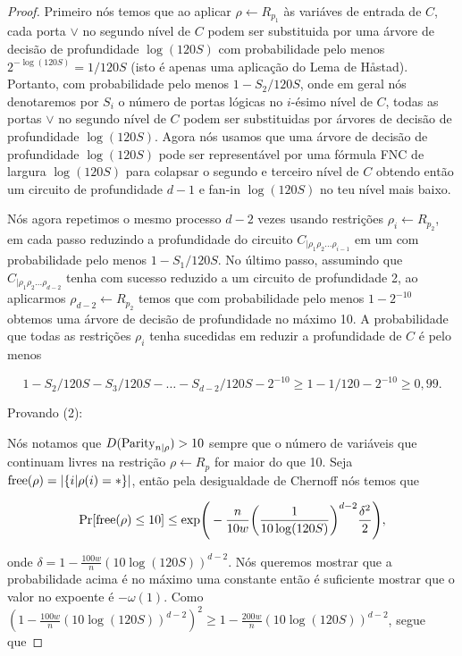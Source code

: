 \begin{proof}
	Primeiro nós temos que ao aplicar $\rho \leftarrow R_{p_{1}}$ às variáves de entrada de $C$, cada porta $\lor$ no segundo nível de $C$ podem ser substituida por uma árvore de decisão de profundidade $\log(120S)$ com probabilidade pelo menos $2^{-\log(120S)} = 1/120S$ (isto é apenas uma aplicação do Lema de Håstad). Portanto, com probabilidade pelo menos $1 - S_{2}/120S$, onde em geral nós denotaremos por $S_{i}$ o número de portas lógicas no $i$-ésimo nível de $C$, todas as portas $\lor$ no segundo nível de $C$ podem ser substituidas por árvores de decisão de profundidade $\log(120S)$. Agora nós usamos que uma árvore de decisão de profundidade $\log(120S)$ pode ser representável por uma fórmula FNC de largura $\log(120S)$ para colapsar o segundo e terceiro nível de $C$ obtendo então um circuito de profundidade $d - 1$ e fan-in $\log(120S)$ no teu nível mais baixo.
	
	Nós agora repetimos o mesmo processo $d - 2$ vezes usando restrições $\rho_{i} \leftarrow R_{p_{2}}$, em cada passo reduzindo a profundidade do circuito $C_{\lvert \rho_{1}\rho_{2}\dots\rho_{i - 1}}$ em um com probabilidade pelo menos $1 - S_{1}/120S$. No último passo, assumindo que $C_{\lvert \rho_{1}\rho_{2}\dots\rho_{d - 2}}$ tenha com sucesso reduzido a um circuito de profundidade 2, ao aplicarmos $\rho_{d - 2} \leftarrow R_{p_{2}}$ temos que com probabilidade pelo menos $1 - 2^{-10}$ obtemos uma árvore de decisão de profundidade no máximo 10. A probabilidade que todas as restrições $\rho_{i}$ tenha sucedidas em reduzir a profundidade de $C$ é pelo menos
	
	\begin{equation*}
		1 - S_{2}/120S - S_{3}/120S - \dots - S_{d - 2}/120S - 2^{-10} \geq 1 - 1/120 - 2^{-10} \geq 0,99.
	\end{equation*}
	
	Provando (2):
	
	Nós notamos que $D(\text{Parity}_{n \lvert \rho}) > 10$ sempre que o número de variáveis que continuam livres na restrição $\rho \leftarrow R_{p}$ for maior do que 10. Seja $\text{free}(\rho) = \lvert \{i \lvert \rho(i) = *\} \rvert$, então pela desigualdade de Chernoff nós temos que
	
	\begin{equation*}
		\Pr[\text{free}(\rho) \leq 10] \leq \text{exp} \Bigg( -\frac{n}{10w} \bigg(\frac{1}{10\log(120S)} \bigg)^{d - 2}\frac{\delta^{2}}{2} \Bigg),
	\end{equation*}
		
	onde $\delta = 1 - \frac{100w}{n}(10\log(120S))^{d - 2}$. Nós queremos mostrar que a probabilidade acima é no máximo uma constante então é suficiente mostrar que o valor no expoente é $-\omega(1)$.  Como $(1 - \frac{100w}{n}(10\log(120S))^{d - 2})^{2} \geq 1 - \frac{200w}{n}(10\log(120S))^{d - 2}$, segue que
	

\end{proof}
